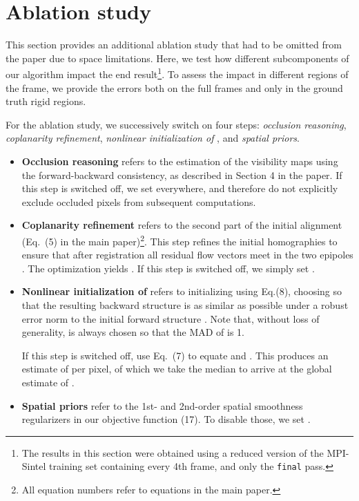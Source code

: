 \documentclass[10pt,twocolumn,letterpaper]{article}
\begin{document}
%
 

\section{Ablation study}
This section provides an additional ablation study that had to be omitted from the paper due to space limitations.
Here, we test how different subcomponents of our algorithm impact the end result\footnote{The results in this section were obtained using a reduced version of the MPI-Sintel training set containing every 4th frame, and only the \texttt{final} pass.}.
To assess the impact in different regions of the frame, we provide the errors both on the full frames and only in the ground truth rigid regions.

For the ablation study, we successively switch on four steps: \textit{occlusion reasoning}, \textit{coplanarity refinement}, \textit{nonlinear initialization of }, and \textit{spatial priors}.


\begin{itemize}
\item \textbf{Occlusion reasoning} refers to the estimation of the visibility maps  using the forward-backward consistency, as described in Section 4 in the paper.
If this step is switched off, we set  everywhere, and therefore do not explicitly exclude occluded pixels from subsequent computations.
\item \textbf{Coplanarity refinement} refers to the second part of the initial alignment (Eq.~(5) in the main paper)\footnote{All equation numbers refer to equations in the main paper.}. This step refines the initial homographies  to ensure that after registration all residual flow vectors meet in the two epipoles .
The optimization yields .
If this step is switched off, we simply set .
\item \textbf{Nonlinear initialization of } refers to initializing  using Eq.(8), \ie choosing  so that the resulting backward  structure is as similar as possible under a robust error norm to the initial forward structure .
Note that, without loss of generality,  is always chosen so that the MAD of  is 1.

If this step is switched off, use Eq.~(7) to equate  and .
This produces an estimate of  per pixel, of which we take the median to arrive at the global estimate of .

\item \textbf{Spatial priors} refer to the 1st- and 2nd-order spatial smoothness regularizers in our objective function (17). To disable those, we set .
\end{itemize}
\end{document}
